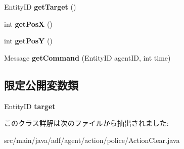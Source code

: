 \begin{DoxyCompactItemize}
Entity\+ID {\bfseries get\+Target} ()
\item 
\hypertarget{classadf_1_1agent_1_1action_1_1police_1_1ActionClear_a21e54fc3a4289d546398f8f623ffe52e}{}\label{classadf_1_1agent_1_1action_1_1police_1_1ActionClear_a21e54fc3a4289d546398f8f623ffe52e} 
int {\bfseries get\+PosX} ()
\item 
\hypertarget{classadf_1_1agent_1_1action_1_1police_1_1ActionClear_a0b81ff28273e1c267147e58cf4bf6595}{}\label{classadf_1_1agent_1_1action_1_1police_1_1ActionClear_a0b81ff28273e1c267147e58cf4bf6595} 
int {\bfseries get\+PosY} ()
\item 
\hypertarget{classadf_1_1agent_1_1action_1_1police_1_1ActionClear_add96a279d2f46903fb7419be6ff21cca}{}\label{classadf_1_1agent_1_1action_1_1police_1_1ActionClear_add96a279d2f46903fb7419be6ff21cca} 
Message {\bfseries get\+Command} (Entity\+ID agent\+ID, int time)
\end{DoxyCompactItemize}
\subsection*{限定公開変数類}
\begin{DoxyCompactItemize}
\item 
\hypertarget{classadf_1_1agent_1_1action_1_1police_1_1ActionClear_a5623b17139cc8f34bbd1f22f22bf836d}{}\label{classadf_1_1agent_1_1action_1_1police_1_1ActionClear_a5623b17139cc8f34bbd1f22f22bf836d} 
Entity\+ID {\bfseries target}
\end{DoxyCompactItemize}


このクラス詳解は次のファイルから抽出されました\+:\begin{DoxyCompactItemize}
\item 
src/main/java/adf/agent/action/police/Action\+Clear.\+java\end{DoxyCompactItemize}
